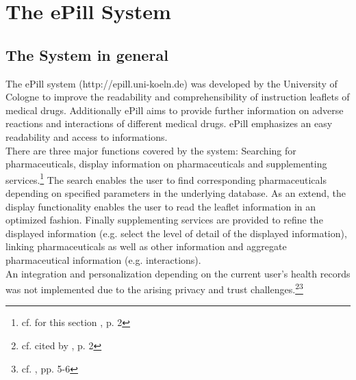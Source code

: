 \section{The ePill System}

\subsection{The System in general}
The ePill system (http://epill.uni-koeln.de) was developed by the University of Cologne to improve the readability and comprehensibility of instruction leaflets of medical drugs. Additionally ePill aims to provide further information on adverse reactions and interactions of different medical drugs. ePill emphasizes an easy readability and access to informations.
\\
There are three major functions covered by the system: Searching for pharmaceuticals, display information on pharmaceuticals and supplementing services.\footnote{cf. for this section \cite{Dehling.2012}, p. 2} The search enables the user to find corresponding pharmaceuticals depending on specified parameters in the underlying database. As an extend, the display functionality enables the user to read the leaflet information in an optimized fashion. Finally supplementing services are provided to refine the displayed information (e.g. select the level of detail of the displayed information), linking pharmaceuticals as well as other information and aggregate pharmaceutical information (e.g. interactions).
\\
An integration and personalization depending on the current user's health records was not implemented due to the arising privacy and trust challenges.\footnote{cf. \cite{Kaletsch.2011} cited by \cite{Dehling.2012}, p. 2}\footnote{cf. \cite{Kaletsch.2011}, pp. 5-6}

